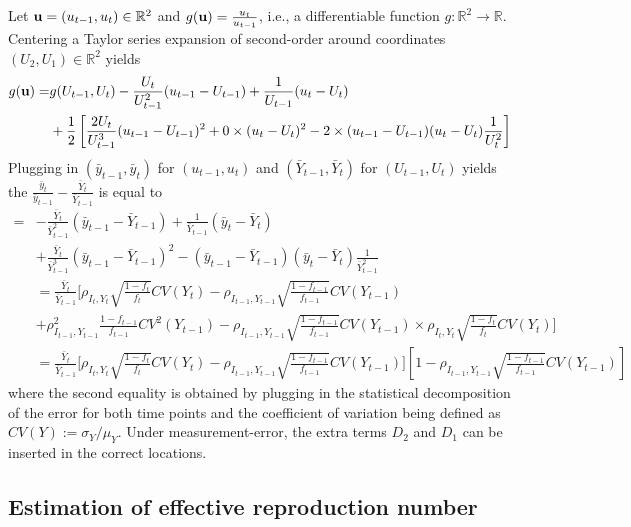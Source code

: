 \documentclass[aoas]{amsart}
\begin{document}
Let ${\bf u} = (u_{t-1},u_t) \in \mathbb{R}^2$ and $g({\bf u}) = \frac{u_t}{u_{t-1}}$, i.e., a differentiable function $g:\mathbb{R}^2 \to \mathbb{R}$. Centering a Taylor series expansion of second-order around coordinates $(U_2, U_1) \in \mathbb{R}^2$ yields
$$
\begin{aligned}
g({\bf u}) =& g(U_{t-1}, U_t) - \frac{U_t}{U_{t-1}^2} (u_{t-1} - U_{t-1}) + \frac{1}{U_{t-1}} (u_t - U_t) \\
&+ \frac{1}{2} \left[ \frac{2 U_t}{U_{t-1}^3} (u_{t-1} - U_{t-1})^2 + 0 \times (u_t - U_t)^2 - 2 \times (u_{t-1} - U_{t-1}) (u_t - U_t) \frac{1}{U_t^2} \right]
\end{aligned}
$$
Plugging in $(\bar y_{t-1}, \bar y_t)$ for $(u_{t-1}, u_t)$ and $(\bar Y_{t-1}, \bar Y_t)$ for $(U_{t-1}, U_t)$ yields the $\frac{\bar y_t}{\bar y_{t-1}} - \frac{\bar Y_t}{\bar Y_{t-1}} $ is equal to
$$
\begin{aligned}
=&
- \frac{\bar Y_t}{\bar Y_{t-1}^2} (\bar y_{t-1} - \bar Y_{t-1}) + \frac{1}{\bar Y_{t-1}} (\bar y_t - \bar Y_t) \\
&+ \frac{\bar Y_t}{\bar Y_{t-1}^3} (\bar y_{t-1} - \bar Y_{t-1})^2 -  (\bar y_{t-1} - \bar Y_{t-1}) (\bar y_t - \bar Y_t) \frac{1}{\bar Y_{t-1}^2} \\
&= \frac{\bar Y_t}{\bar Y_{t-1}} \bigg[  \rho_{I_t,Y_t} \sqrt{\frac{1-f_t}{f_t}} CV (Y_t)  -\rho_{I_{t-1},Y_{t-1}} \sqrt{\frac{1-f_{t-1}}{f_{t-1}}} CV (Y_{t-1}) \\
&+ \rho^2_{I_{t-1},Y_{t-1}} \frac{1-f_{t-1}}{f_{t-1}} CV^2 (Y_{t-1}) -  \rho_{I_{t-1},Y_{t-1}} \sqrt{\frac{1-f_{t-1}}{f_{t-1}}} CV (Y_{t-1}) \times
\rho_{I_t,Y_t} \sqrt{\frac{1-f_t}{f_t}} CV (Y_t)   \bigg] \\
&= \frac{\bar Y_t}{\bar Y_{t-1}} \bigg[ \rho_{I_t,Y_t} \sqrt{\frac{1-f_t}{f_t}} CV (Y_t)  -\rho_{I_{t-1},Y_{t-1}} \sqrt{\frac{1-f_{t-1}}{f_{t-1}}} CV (Y_{t-1}) \bigg] \left[ 1 - \rho_{I_{t-1},Y_{t-1}} \sqrt{\frac{1-f_{t-1}}{f_{t-1}}} CV (Y_{t-1}) \right]
\end{aligned}
$$
where the second equality is obtained by plugging in the statistical decomposition of the error for both time points and the coefficient of variation being defined as $CV(Y) := \sigma_Y/\mu_Y$.  Under measurement-error, the extra terms $D_{2}$ and $D_1$ can be inserted in the correct locations.

\subsection{Estimation of effective reproduction number}
\end{document}
